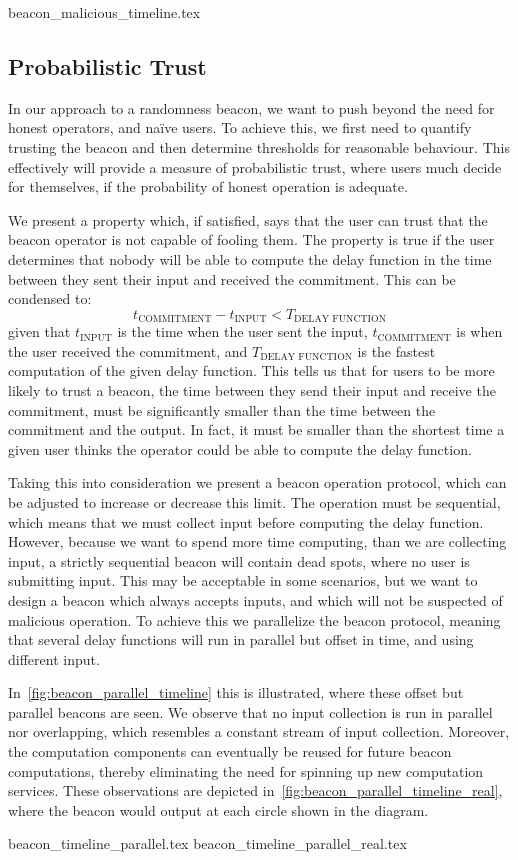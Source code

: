 {beacon_malicious_timeline.tex}

\subsection{Probabilistic Trust}%
\label{sub:probabilistic_trust}
In our approach to a randomness beacon, we want to push beyond the need for honest operators, and naïve users.
To achieve this, we first need to quantify trusting the beacon and then determine thresholds for reasonable behaviour.
This effectively will provide a measure of probabilistic trust, where users much decide for themselves, if the probability of honest operation is adequate.

We present a property which, if satisfied, says that the user can trust that the beacon operator is not capable of fooling them.
The property is true if the user determines that nobody will be able to compute the delay function in the time between they sent their input and received the commitment.
This can be condensed to:
\begin{equation}
    t_\text{COMMITMENT} - t_\text{INPUT} < T_\text{DELAY FUNCTION}
\end{equation}
given that $t_\text{INPUT}$ is the time when the user sent the input, $t_\text{COMMITMENT}$ is when the user received the commitment, and $T_\text{DELAY FUNCTION}$ is the fastest computation of the given delay function.
This tells us that for users to be more likely to trust a beacon, the time between they send their input and receive the commitment, must be significantly smaller than the time between the commitment and the output.
In fact, it must be smaller than the shortest time a given user thinks the operator could be able to compute the delay function.

Taking this into consideration we present a beacon operation protocol, which can be adjusted to increase or decrease this limit.
The operation must be sequential, which means that we must collect input before computing the delay function.
However, because we want to spend more time computing, than we are collecting input, a strictly sequential beacon will contain dead spots, where no user is submitting input.
This may be acceptable in some scenarios, but we want to design a beacon which always accepts inputs, and which will not be suspected of malicious operation.
To achieve this we parallelize the beacon protocol, meaning that several delay functions will run in parallel but offset in time, and using different input.

In~\cref{fig:beacon_parallel_timeline} this is illustrated, where these offset but parallel beacons are seen.
We observe that no input collection is run in parallel nor overlapping, which resembles a constant stream of input collection.
Moreover, the computation components can eventually be reused for future beacon computations, thereby eliminating the need for spinning up new computation services.
These observations are depicted in~\cref{fig:beacon_parallel_timeline_real}, where the beacon would output at each circle shown in the diagram.

{beacon_timeline_parallel.tex}
{beacon_timeline_parallel_real.tex}
